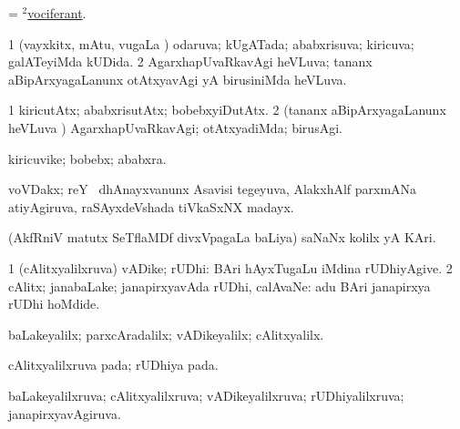 \bentry
{} 
\gl{\nA}
\expl{}
\bmng
 = \hyperlink{vociferant(2)}{$^2$vociferant}. 
\emng
\eentry

\bentry
{} 
\gl{\gu}
\expl{}
\bmng
\bnum
\num{1} (vayxkitx, mAtu, \mo vugaLa \vi) odaruva; kUgATada; ababxrisuva; kiricuva; galATeyiMda kUDida. 
\num{2} AgarxhapUvaRkavAgi heVLuva; tananx aBipArxyagaLanunx otAtxyavAgi yA birusiniMda heVLuva. 
\enum
\emng
\eentry

\bentry
{} 
\gl{\kirxvi}
\expl{}
\bmng
\bnum
\num{1} kiricutAtx; ababxrisutAtx; bobebxyiDutAtx. 
\num{2} (tananx aBipArxyagaLanunx heVLuva \vi) AgarxhapUvaRkavAgi; otAtxyadiMda; birusAgi. 
\enum
\emng
\eentry

\bentry 
{} 
\gl{\nA}
\expl{}
\bmng
 kiricuvike; bobebx; ababxra. 
\emng
\eentry

\bentry 
{} 
\gl{\nA}
\expl{}
\bmng
 voVDakx; reY \mo\ dhAnayxvanunx Asavisi tegeyuva, AlakxhAlf parxmANa atiyAgiruva, raSAyxdeVshada tiVkaSxNX madayx. 
\emng
\eentry

\bentry
{} 
\gl{\nA}
\expl{}
\bmng
 (AkfRniV matutx SeTflaMDf divxVpagaLa baLiya) saNaNx kolilx yA KAri. 
\emng
\eentry

\bentry 
{} 
\gl{\nA}
\expl{}
\bmng
\bnum
\num{1} (cAlitxyalilxruva) vADike; rUDhi:  BAri hAyxTugaLu iMdina rUDhiyAgive. 
\num{2} cAlitx; janabaLake; janapirxyavAda rUDhi, calAvaNe:  adu BAri janapirxya rUDhi hoMdide. 
\enum
\emng

\noindent 
\gl{\pagu}
\expl{}
\bmng
  baLakeyalilx; parxcAradalilx; vADikeyalilx; cAlitxyalilx. 
\emng
\eentry

\bentry 
{} 
\gl{\nA}
\expl{}
\bmng
 cAlitxyalilxruva pada; rUDhiya pada. 
\emng
\eentry

\bentry 
{} 
\gl{\gu}
\expl{}
\bmng
 baLakeyalilxruva; cAlitxyalilxruva; vADikeyalilxruva; rUDhiyalilxruva; janapirxyavAgiruva. 
\emng
\eentry


